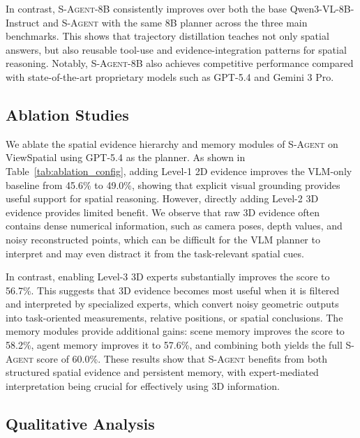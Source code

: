 In contrast, \textsc{S-Agent-8B} consistently improves over both the base Qwen3-VL-8B-Instruct and \textsc{S-Agent} with the same 8B planner across the three main benchmarks. 
This shows that trajectory distillation teaches not only spatial answers, but also reusable tool-use and evidence-integration patterns for spatial reasoning. 
Notably, \textsc{S-Agent-8B} also achieves competitive performance compared with state-of-the-art proprietary models such as GPT-5.4 and Gemini 3 Pro.


% 

\subsection{Ablation Studies}
\label{sec:experiments:ablation}
We ablate the spatial evidence hierarchy and memory modules of \textsc{S-Agent} on ViewSpatial using GPT-5.4 as the planner. 
As shown in Table~\ref{tab:ablation_config}, adding Level-1 2D evidence improves the VLM-only baseline from 45.6\% to 49.0\%, showing that explicit visual grounding provides useful support for spatial reasoning. 
However, directly adding Level-2 3D evidence provides limited benefit. 
We observe that raw 3D evidence often contains dense numerical information, such as camera poses, depth values, and noisy reconstructed points, which can be difficult for the VLM planner to interpret and may even distract it from the task-relevant spatial cues.

In contrast, enabling Level-3 3D experts substantially improves the score to 56.7\%. 
This suggests that 3D evidence becomes most useful when it is filtered and interpreted by specialized experts, which convert noisy geometric outputs into task-oriented measurements, relative positions, or spatial conclusions. 
The memory modules provide additional gains: scene memory improves the score to 58.2\%, agent memory improves it to 57.6\%, and combining both yields the full \textsc{S-Agent} score of 60.0\%. 
These results show that \textsc{S-Agent} benefits from both structured spatial evidence and persistent memory, with expert-mediated interpretation being crucial for effectively using 3D information.

% 

\subsection{Qualitative Analysis}
\label{sec:experiments:analysis}

